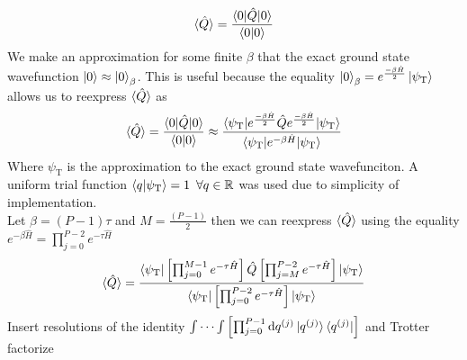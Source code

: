 \documentclass[12pt,letterpaper,oneside,final,titlepage]{article}               %
\numberwithin{equation}{section} %
\newcommand{\psiT}{\psi_{\textrm{T}}}
\newcommand{\eBHf}{e^{\frac{-\beta\hat{H}}{2}}}
\newcommand{\eBH}{e^{-\beta\hat{H}}}
\newcommand{\eTH}{e^{-\tau\hat{H}}}
\begin{document}
\begin{equation}
    \braket{\hat{Q}} = \frac{\braket{0|\hat{Q}|0}}{\braket{0|0}}
\end{equation}
We make an approximation for some finite $\beta$ that the exact ground state wavefunction $\ket{0} \approx \ket{0}_{\beta}$.
This is useful because the equality $\ket{0}_{\beta} = \eBHf\ket{\psiT}$ allows us to reexpress $\braket{\hat{Q}}$ as
\begin{equation}
    \braket{\hat{Q}} = \frac{\braket{0|\hat{Q}|0}}{\braket{0|0}} \approx \frac{\braket{\psiT|\eBHf\hat{Q}\eBHf|\psiT}} {\braket{\psiT|\eBH|\psiT}} 
\end{equation}
Where $\psiT$ is the approximation to the exact ground state wavefunciton. 
A uniform trial function $\braket{q|\psiT} = 1 \,\,\,\forall q \in \mathbb{R} $ was used due to simplicity of implementation. \\
Let $\beta = (P-1)\tau$ and $M = \frac{(P-1)}{2}$ then we can reexpress $\braket{\hat{Q}}$ using the equality $\eBH = \prod_{j=0}^{P-2} \eTH$
\begin{align*}
    \braket{\hat{Q}} = \frac{\braket{\psiT|
                            \left[\prod_{j=0}^{M-1} \eTH\right]
                            \hat{Q}
                            \left[\prod_{j=M}^{P-2} \eTH\right]
                            |\psiT}}
                            {\braket{\psiT|\left[\prod_{j=0}^{P-2} \eTH\right]|\psiT}} 
\end{align*}
Insert resolutions of the identity 
$\int\cdots\int\left[\prod_{j=0}^{P-1}\dif q^{(j)}\ket{q^{(j)}}\bra{q^{(j)}}\right]$ and Trotter factorize
\end{document}
